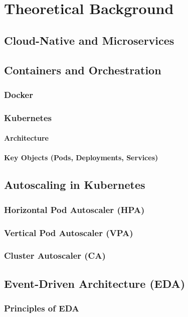 \chapter{Theoretical Background}
\label{cha:background}

\section{Cloud-Native and Microservices}

\section{Containers and Orchestration}
\subsection{Docker}
\subsection{Kubernetes}
\subsubsection{Architecture}
\subsubsection{Key Objects (Pods, Deployments, Services)}

\section{Autoscaling in Kubernetes}
\subsection{Horizontal Pod Autoscaler (HPA)}
\subsection{Vertical Pod Autoscaler (VPA)}
\subsection{Cluster Autoscaler (CA)}

\section{Event-Driven Architecture (EDA)}
\subsection{Principles of EDA}
